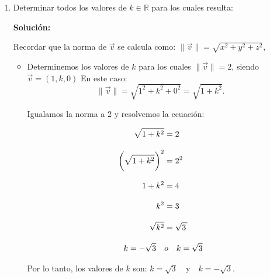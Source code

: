 \documentclass[11pt,a4paper]{article}
\begin{document}
\begin{enumerate}[\hspace{-5mm} 1) ]
\item  Determinar todos los valores de $k \in \mathbb{R}$ para los cuales resulta:

    \begin{itemize}
    \end{itemize}





\textbf{Solución:}


Recordar que la norma de $\vec{v}$ se calcula como: \qquad $\|\vec{v}\| = \sqrt{x^2 + y^2 + z^2},$

    

\begin{itemize}
    \item[a)] Determinemos los valores de $k$ para los cuales $\|\vec{v}\| = 2$, siendo $\vec{v} = (1, k, 0)$  En este caso: 
    $$
    \|\vec{v}\| = \sqrt{1^2 + k^2 + 0^2} = \sqrt{1 + k^2}. $$

    \medskip
     
    Igualamos la norma a 2 y resolvemos la ecuación:

    \begin{minipage}{.45\textwidth} 
    \begin{align*}
        \sqrt{1 + k^2}& = 2
        \\[3mm]
       \left( \sqrt{1 + k^2}  \rule{0mm}{4.5mm}\right)^2 &= 2^2
        \\[3mm]
        1 + k^2 &= 4 
        \\[3mm] 
        k^2 &= 3 
        \\[3mm]
        \sqrt{k^2} &= \sqrt{ 3 \, }
        \\[3mm]%
     k =  - \sqrt{3} \quad&o    \quad k=\sqrt{3} 
    \end{align*}
     \end{minipage}
      


    Por lo tanto, los valores de $k$ son: \qquad $    k = \sqrt{3} \quad \text{y} \quad k = -\sqrt{3}.$ 



\end{itemize}
\end{enumerate}
\end{document}
